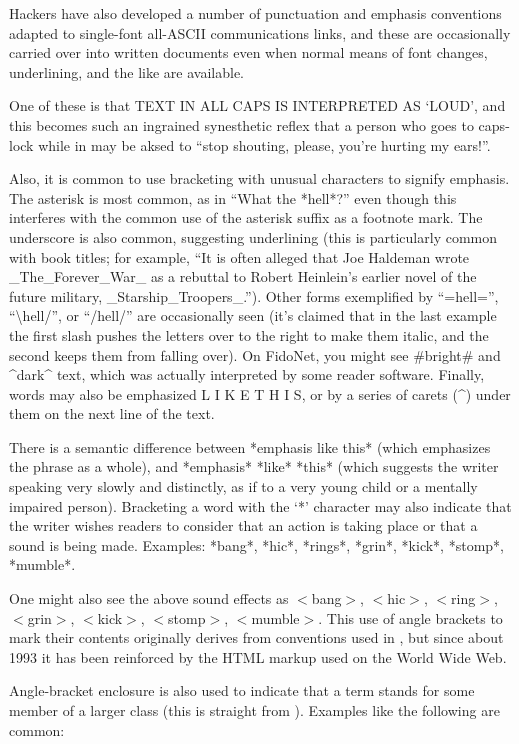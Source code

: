 Hackers have also developed a number of punctuation and emphasis conventions adapted to single-font all-ASCII communications links, and
these are occasionally carried over into written documents even when normal means of font changes, underlining, and the like are available.

One of these is that TEXT IN ALL CAPS IS INTERPRETED AS `LOUD', and this becomes such an ingrained synesthetic reflex that a person who
goes to caps-lock while in  may be aksed to ``stop shouting, please, you're hurting my ears!''.

Also, it is common to use bracketing with unusual characters to signify emphasis. The asterisk is most common, as in ``What the *hell*?''
even though this interferes with the common use of the asterisk suffix as a footnote mark. The underscore is also common, suggesting
underlining (this is particularly common with book titles; for example, ``It is often alleged that Joe Haldeman wrote \_The\_Forever\_War\_
as a rebuttal to Robert Heinlein's earlier novel of the future military, \_Starship\_Troopers\_.''). Other forms exemplified by ``=hell='',
``\textbackslash hell/'', or ``/hell/'' are occasionally seen (it's claimed that in the last example the first
slash pushes the letters over to the right to make them italic, and the second keeps them from falling over). On FidoNet, you might see
\#bright\# and \^{}dark\^{} text, which was actually interpreted by some reader software. Finally, words may also be emphasized L I K E T H
I S, or by a series of carets (\^{}) under them on the next line of the text.

There is a semantic difference between *emphasis like this* (which emphasizes the phrase as a whole), and *emphasis* *like* *this* (which
suggests the writer speaking very slowly and distinctly, as if to a very young child or a mentally impaired person). Bracketing a word with
the `*' character may also indicate that the writer wishes readers to consider that an action is taking place or that a sound is being
made. Examples: *bang*, *hic*, *rings*, *grin*, *kick*, *stomp*, *mumble*.

One might also see the above sound effects as $<$bang$>$, $<$hic$>$, $<$ring$>$, $<$grin$>$, $<$kick$>$, $<$stomp$>$, $<$mumble$>$. This
use of angle brackets to mark their contents originally derives from conventions used in , but since about 1993 it has been
reinforced by the HTML markup used on the World Wide Web.

Angle-bracket enclosure is also used to indicate that a term stands for some  member of a larger class (this is straight
from ). Examples like the following are common:

